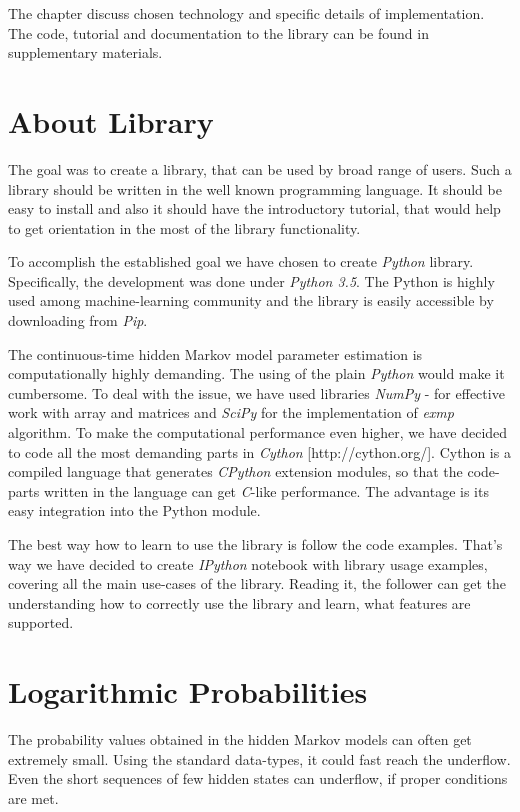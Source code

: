 \documentclass[thesis=M,english]{FITthesis}[2012/10/20]
\begin{document}
The chapter discuss chosen technology and specific details of implementation. 
The code, tutorial and documentation to the library can be found in supplementary materials.

\section{About Library}

The goal was to create a library, that can be used by broad range of users. Such a library should be written in the well known programming language. It should be easy to install and also it should have the introductory tutorial, that would help to get orientation in the most of the library functionality. 

To accomplish the established goal we have chosen to create \textit{Python} library. Specifically, the development was done under \textit{Python 3.5}. The Python is highly used among machine-learning community and the library is easily accessible by downloading from \textit{Pip}. %

The continuous-time hidden Markov model parameter estimation is computationally highly demanding. The using of the plain \textit{Python} would make it cumbersome. To deal with the issue, we have used libraries \textit{NumPy} - for effective work with array and matrices and \textit{SciPy} \cite{Sc01} for the implementation of \textit{exmp} algorithm. To make the computational performance even higher, we have decided to code all the most demanding parts in \textit{Cython} [http://cython.org/]. Cython is a compiled language that generates \textit{CPython} extension modules, so that the code-parts written in the language can get \textit{C}-like performance. The advantage is its easy integration into the Python module.

The best way how to learn to use the library is follow the code examples. That's way we have decided to create \textit{IPython} notebook with library usage examples, covering all the main use-cases of the library. Reading it, the follower can get the understanding how to correctly use the library and learn, what features are supported.          


\section{Logarithmic Probabilities}

The probability values obtained in the hidden Markov models can often get extremely small. Using the standard data-types, it could fast reach the underflow. Even the short sequences of few hidden states can underflow, if proper conditions are met. 
\end{document}
